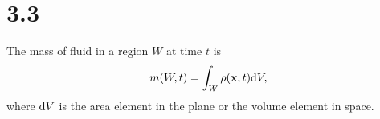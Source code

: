 \section{3.3}
\label{sec:3.3}

\begin{prop}
  The mass of fluid in a region $W$ at time $t$ is
  \begin{equation}
    \label{eq:totalMass}
    m(W,t) = \int_W\rho(\mathbf{x},t)\mathrm{d} V,
  \end{equation}
  where $\mathrm{d} V$ is the area element in the plane
  or the volume element in space.
\end{prop}

